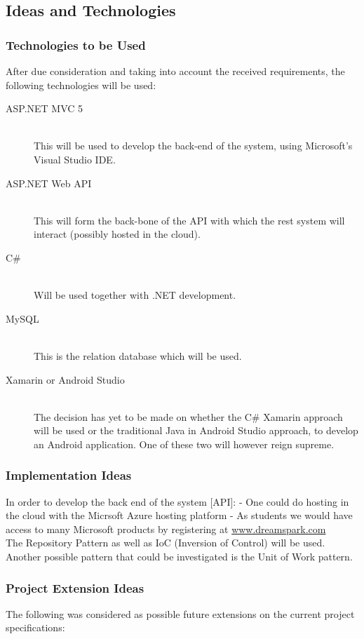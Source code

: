 \subsection{Ideas and Technologies}
\subsubsection{Technologies to be Used}
After due consideration and taking into account the received requirements, the following technologies will be used:
\begin{description}
	\item[ASP.NET MVC 5]\hfill\\
	This will be used to develop the back-end of the system, using Microsoft's Visual Studio IDE.
	\item[ASP.NET Web API]\hfill\\
	This will form the back-bone of the API with which the rest system will interact (possibly hosted in the cloud).
	\item[C\#]\hfill\\
	Will be used together with .NET development.
	\item[MySQL]\hfill\\	
	This is the relation database which will be used.
		\item[Xamarin or Android Studio]\hfill\\
	The decision has yet to be made on whether the C\# Xamarin approach will be used or the traditional Java in Android Studio approach, to develop an Android application. One of these two will however reign supreme.
	
\end{description}
	
\subsubsection{Implementation Ideas}	
In order to develop the back end of the system [API]:
- One could do hosting in the cloud with the Micrsoft Azure hosting platform
- As students we would have access to many Microsoft products by registering at \href{http://www.dreamspark.com}{www.dreamspark.com}\\
The Repository Pattern as well as IoC (Inversion of Control) will be used. Another possible pattern that could be investigated is the Unit of Work pattern.
	
\subsubsection{Project Extension Ideas}
The following was considered as possible future extensions on the current project specifications:

